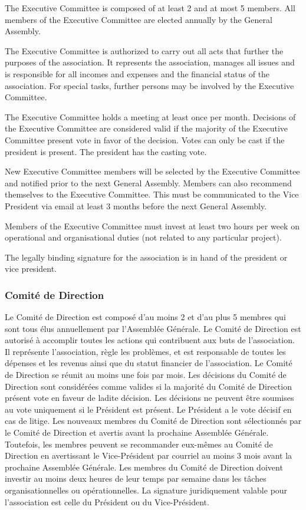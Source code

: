 \documentclass[12pt,a4paper,oneside]{article}
\newcounter{art}
\newcommand{\french}{    \switchcolumn[1]\noindent}
\begin{document}
\begin{paracol}{2}
	The Executive Committee is composed of at least 2 and at most 5 members. 
	All members of the Executive Committee are elected annually by the General Assembly.

	The Executive Committee is authorized to carry out all acts that further the purposes of the association. It represents the association, manages all issues and is responsible for all incomes and expenses and the financial status of the association. For special tasks, further persons may be involved by the Executive Committee. 

	The Executive Committee holds a meeting at least once per month. 
	Decisions of the Executive Committee are considered valid if the majority of the Executive Committee present vote in favor of the decision. Votes can only be cast if the president is present. The president has the casting vote.

	New Executive Committee members will be selected by the Executive Committee and notified prior to the next General Assembly. Members can also recommend themselves to the Executive Committee. This must be communicated to the Vice President via email at least 3 months before the next General Assembly.

	Members of the Executive Committee must invest at least two hours per week on operational and organisational duties (not related to any particular project).

	The legally binding signature for the association is in hand of the president or vice president.
 

	\french
	\subsubsection{Comité de Direction}
	Le Comité de Direction est composé d’au moins 2 et d’au plus 5 membres qui sont tous élus annuellement par l’Assemblée Générale. Le Comité de Direction est autorisé à accomplir toutes les actions qui contribuent aux buts de l’association.	Il représente l’association, règle les problèmes, et est responsable de toutes les dépenses et les revenus ainsi que du statut financier de l’association.
	Le Comité de Direction se réunit au moins une fois par mois. Les décisions du Comité de Direction sont considérées comme valides si la majorité du Comité de Direction présent vote en faveur de ladite décision. Les décisions ne peuvent être soumises au vote uniquement si le Président est présent. Le Président a le vote décisif en cas de litige.
	Les nouveaux membres du Comité de Direction sont sélectionnés par le Comité de Direction et avertis avant la prochaine Assemblée Générale. Toutefois, les membres peuvent se recommander eux-mêmes au Comité de Direction en avertissant le Vice-Président par courriel au moins 3 mois avant la prochaine Assemblée Générale.
	Les membres du Comité de Direction doivent investir au moins deux heures de leur temps par semaine dans les tâches organisationnelles ou opérationnelles. La signature juridiquement valable pour l’association est celle du Président ou du Vice-Président.



\end{paracol}
\end{document}
